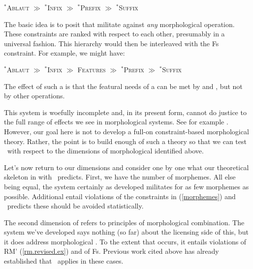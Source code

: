 \documentclass[output=paper,
modfonts
]{LSP/langsci}
\begin{document}
\ea
\label{morphemes}
${}^*$\textsc{Ablaut} $\gg$
${}^*$\textsc{Infix} $\gg$
${}^*$\textsc{Prefix} $\gg$
${}^*$\textsc{Suffix}
\z

\noindent The basic idea is to posit  that militate against \emph{any} morphological operation. These constraints are ranked with respect to each other, presumably in a universal fashion. This hierarchy would then be interleaved with the Fs constraint. For example, we might have:

\ea
${}^*$\textsc{Ablaut} $\gg$
${}^*$\textsc{Infix} $\gg$
\textsc{Features} $\gg$
${}^*$\textsc{Prefix} $\gg$
${}^*$\textsc{Suffix}
\z

\noindent The effect of such a  is that the featural needs of a  can be met by  and , but not by other operations.

This system is woefully incomplete and, in its present form, cannot do justice to the full range of effects we see in morphological systems. See\add{,} for example\add{,} \cite{where,amorphous}.  However, our goal here is not to develop a full-on constraint-based morphological theory. Rather, the point is to build enough of such a theory so that we can test \io\ with respect to the dimensions of morphological  identified above.

Let's now return to our dimensions and consider one by one what our theoretical skeleton in  with \io\ predicts. First, we have the number of morphemes. All else being equal, the system certainly as developed militates for as few morphemes as possible. Additional   entail violations of the constraints in (\ref{morphemes}) and \io\ predicts these should be avoided statistically.

The second dimension of  refers to principles of morphological combination. The system we've developed says nothing (so far) about the licensing side of this, but it does address morphological . To the extent that  occurs, it entails violations of RM' (\ref{rm.revised.ex}) and of Fs. Previous work cited above has already established that \io\ applies in these cases.
\end{document}
